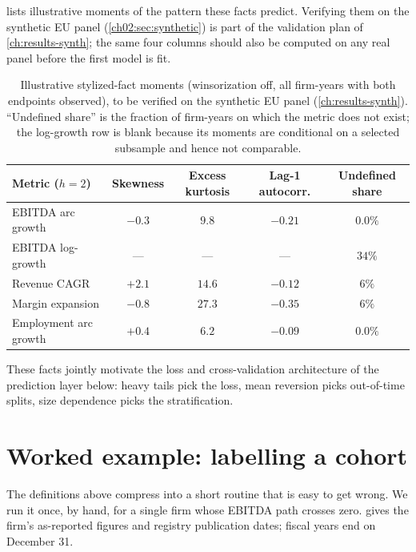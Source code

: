  lists illustrative moments of the pattern these facts predict.
Verifying them on the synthetic EU panel (\cref{ch02:sec:synthetic}) is part of the validation
plan of \cref{ch:results-synth}; the same four columns should also be computed on any real
panel before the first model is fit.

\begin{table}[htbp]
\centering
\small
\begin{tabular}{lcccc}
\toprule
Metric ($h=2$) & Skewness & Excess kurtosis & Lag-1 autocorr. &
Undefined share \\
\midrule
EBITDA arc growth      & $-0.3$ & $9.8$  & $-0.21$ & $0.0\%$ \\
EBITDA log-growth      & ---    & ---    & ---     & $34\%$ \\
Revenue CAGR           & $+2.1$ & $14.6$ & $-0.12$ & $6\%$ \\
Margin expansion       & $-0.8$ & $27.3$ & $-0.35$ & $6\%$ \\
Employment arc growth  & $+0.4$ & $6.2$  & $-0.09$ & $0.0\%$ \\
\bottomrule
\end{tabular}
\caption{Illustrative stylized-fact moments (winsorization off, all
firm-years with both endpoints observed), to be verified on the
synthetic EU panel (\cref{ch:results-synth}). ``Undefined share''
is the fraction of firm-years on which the metric does not exist; the
log-growth row is blank because its moments are conditional on a
selected subsample and hence not comparable.}
\label{cheu:tab:stylized}
\end{table}

These facts jointly motivate the loss and cross-validation architecture of the prediction layer
below: heavy tails pick the loss, mean reversion picks out-of-time splits, size dependence picks
the stratification.

\section{Worked example: labelling a cohort}\label{cheu:sec:worked}

The definitions above compress into a short routine that is easy to get wrong. We run it once,
by hand, for a single firm whose EBITDA path crosses zero.
 gives the firm's as-reported figures and registry publication dates;
fiscal years end on December 31.

